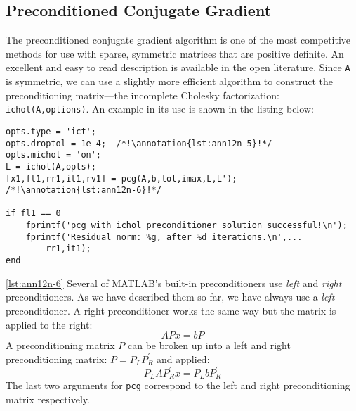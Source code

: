\subsection{Preconditioned Conjugate Gradient}
The preconditioned conjugate gradient algorithm is one of the most competitive methods for use with sparse, symmetric matrices that are positive definite.  An excellent and easy to read description is available in the open literature.\cite{shewchuk1994conjugate}  Since \lstinline[style=myMatlab]{A} is symmetric, we can use a slightly more efficient algorithm to construct the preconditioning matrix---the incomplete Cholesky factorization: \lstinline[style=myMatlab]{ichol(A,options)}.  An example in its use is shown in the listing below:
\begin{lstlisting}[style=myMatlab]
%% preconditioned conjugate gradient
opts.type = 'ict';
opts.droptol = 1e-4;  /*!\annotation{lst:ann12n-5}!*/
opts.michol = 'on';
L = ichol(A,opts);
[x1,fl1,rr1,it1,rv1] = pcg(A,b,tol,imax,L,L'); /*!\annotation{lst:ann12n-6}!*/

if fl1 == 0
    fprintf('pcg with ichol preconditioner solution successful!\n');
    fprintf('Residual norm: %g, after %d iterations.\n',...
        rr1,it1);
end
\end{lstlisting}

\vspace{0.1cm}

\noindent \ref{lst:ann12n-6} Several of MATLAB's built-in preconditioners use \emph{left} and \emph{right} preconditioners.  As we have described them so far, we have always use a \emph{left} preconditioner.  A right preconditioner works the same way but the matrix is applied to the right:
$$APx = bP  $$
A preconditioning matrix $P$ can be broken up into a left and right preconditioning matrix: $P = P_L P_R^{\prime}$ and applied: $$P_L A P_R^{\prime} x = P_{L}bP_R^{\prime}$$
The last two arguments for \lstinline[style=myMatlab]{pcg} correspond to the left and right preconditioning matrix respectively.   

